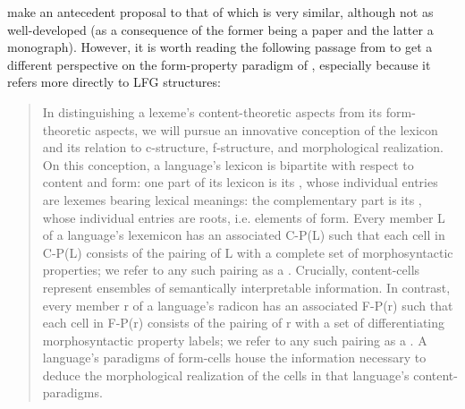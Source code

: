\documentclass[output=paper,hidelinks]{langscibook}
\begin{document}
\citet{ackerman;stump04} make an antecedent proposal to that of
\citet{spencer13} which is very similar, although not as
well-developed (as a consequence of the former being a paper and the
latter a monograph). However, it is worth reading the following
passage from \citet{ackerman;stump04} to get a different perspective
on the form-property paradigm of \citet{spencer13}, especially because
it refers more directly to LFG structures:
%
\begin{quote}
  \begin{sloppypar}
    In distinguishing a lexeme's content-theoretic aspects from its
    form-theo\-retic aspects, we will pursue an innovative conception
    of the lexicon and its relation to c-structure, f-structure, and
    morphological realization. On this conception, a language's
    lexicon is bipartite with respect to content and form: one part of
    its lexicon is its , whose individual entries are
    lexemes bearing lexical meanings: the complementary part is its
    , whose individual entries are roots, i.e. elements
    of form. Every member L of a language's lexemicon has an
    associated  C-P(L) such that each cell in
    C-P(L) consists of the pairing of L with a complete set of
    morphosyntactic properties; we refer to any such pairing as a
    . Crucially, content-cells represent ensembles
    of semantically interpretable information. In contrast, every
    member r of a language's radicon has an associated
     F-P(r) such that each cell in F-P(r) consists
    of the pairing of r with a set of differentiating morphosyntactic
    property labels; we refer to any such pairing as a
    . A language's paradigms of form-cells house the
    information necessary to deduce the morphological realization of
    the cells in that language’s content-paradigms.
    \citep[117--118]{ackerman;stump04}
  \end{sloppypar}
\end{quote}
%
\end{document}
